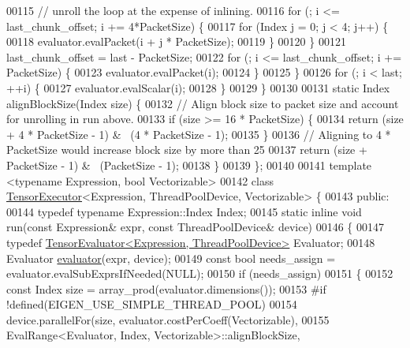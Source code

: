 \begin{DoxyCode}
00115       \textcolor{comment}{// unroll the loop at the expense of inlining.}
00116       \textcolor{keywordflow}{for} (; i <= last\_chunk\_offset; i += 4*PacketSize) \{
00117         \textcolor{keywordflow}{for} (Index j = 0; j < 4; j++) \{
00118           evaluator.evalPacket(i + j * PacketSize);
00119         \}
00120       \}
00121       last\_chunk\_offset = last - PacketSize;
00122       \textcolor{keywordflow}{for} (; i <= last\_chunk\_offset; i += PacketSize) \{
00123         evaluator.evalPacket(i);
00124       \}
00125     \}
00126     \textcolor{keywordflow}{for} (; i < last; ++i) \{
00127       evaluator.evalScalar(i);
00128     \}
00129   \}
00130 
00131   \textcolor{keyword}{static} Index alignBlockSize(Index size) \{
00132     \textcolor{comment}{// Align block size to packet size and account for unrolling in run above.}
00133     \textcolor{keywordflow}{if} (size >= 16 * PacketSize) \{
00134       \textcolor{keywordflow}{return} (size + 4 * PacketSize - 1) & ~(4 * PacketSize - 1);
00135     \}
00136     \textcolor{comment}{// Aligning to 4 * PacketSize would increase block size by more than 25%
00137     \textcolor{keywordflow}{return} (size + PacketSize - 1) & ~(PacketSize - 1);
00138   \}
00139 \};
00140 
00141 \textcolor{keyword}{template} <\textcolor{keyword}{typename} Expression, \textcolor{keywordtype}{bool} Vectorizable>
00142 \textcolor{keyword}{class }\hyperlink{class_eigen_1_1internal_1_1_tensor_executor}{TensorExecutor}<Expression, ThreadPoolDevice, Vectorizable> \{
00143  \textcolor{keyword}{public}:
00144   \textcolor{keyword}{typedef} \textcolor{keyword}{typename} Expression::Index Index;
00145   \textcolor{keyword}{static} \textcolor{keyword}{inline} \textcolor{keywordtype}{void} run(\textcolor{keyword}{const} Expression& expr, \textcolor{keyword}{const} ThreadPoolDevice& device)
00146   \{
00147     \textcolor{keyword}{typedef} \hyperlink{struct_eigen_1_1_tensor_evaluator}{TensorEvaluator<Expression, ThreadPoolDevice>} 
      Evaluator;
00148     Evaluator \hyperlink{struct_eigen_1_1internal_1_1evaluator}{evaluator}(expr, device);
00149     \textcolor{keyword}{const} \textcolor{keywordtype}{bool} needs\_assign = evaluator.evalSubExprsIfNeeded(NULL);
00150     \textcolor{keywordflow}{if} (needs\_assign)
00151     \{
00152       \textcolor{keyword}{const} Index size = array\_prod(evaluator.dimensions());
00153 \textcolor{preprocessor}{#if !defined(EIGEN\_USE\_SIMPLE\_THREAD\_POOL)}
00154       device.parallelFor(size, evaluator.costPerCoeff(Vectorizable),
00155                          EvalRange<Evaluator, Index, Vectorizable>::alignBlockSize,
}
\end{DoxyCode}
